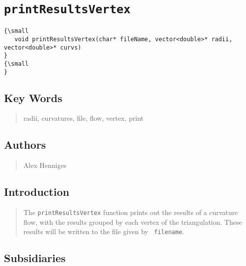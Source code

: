                       


\section*{\texttt{printResultsVertex}}

\label{f0}

\begin{quotation}
{\small }
\end{quotation}

\begin{verbatim}
{\small 
   void printResultsVertex(char* fileName, vector<double>* radii, vector<double>* curvs)
}
{\small    
}
\end{verbatim}

\subsection*{Key Words}

\begin{quotation}
radii, curvatures, file, flow, vertex, print
\end{quotation}

\subsection*{Authors}

\begin{quotation}
Alex Henniges
\end{quotation}

\subsection*{Introduction}

\begin{quotation}
The \texttt{printResultsVertex} function prints out the results of a
curvature flow, with the results grouped by each vertex of the
triangulation. These results will be written to the file given by \texttt{%
filename}.
\end{quotation}

\subsection*{Subsidiaries}

